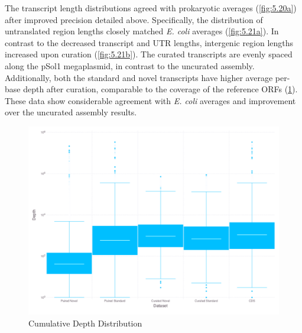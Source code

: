 The transcript length distributions agreed with prokaryotic averages (\ref{fig:5.20a}) after improved precision detailed above.\cite{86} Specifically, the distribution of untranslated region lengths closely matched \textit{E. coli} averages\cite{87} (\ref{fig:5.21a}). In contrast to the decreased transcript and UTR lengths, intergenic region lengths increased upon curation (\ref{fig:5.21b}). The curated transcripts are evenly spaced along the pSol1 megaplasmid, in contrast to the uncurated assembly. Additionally, both the standard and novel transcripts have higher average per-base depth after curation, comparable to the coverage of the reference ORFs (\ref{fig:5.22}). These data show considerable agreement with \textit{E. coli} averages and improvement over the uncurated assembly results.



\begin{figure}
\includegraphics[width=\textwidth]{images/Assembly/Curation/CurvsUncur_boxplot.png}
\caption{Cumulative Depth Distribution}\label{fig:5.22}
\end{figure}


